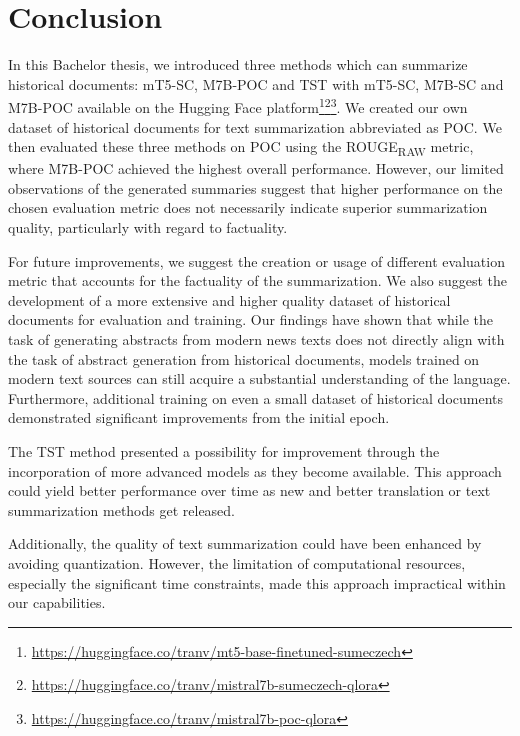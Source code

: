 \documentclass[english, ba, kiv, he, iso690numb, pdf, viewonly]{fasthesis}
\begin{document}
\chapter{Conclusion}
In this Bachelor thesis, we introduced three methods which can summarize historical documents: mT5-SC, M7B-POC and TST with mT5-SC, M7B-SC and M7B-POC available on the Hugging Face platform\footnote{\url{https://huggingface.co/tranv/mt5-base-finetuned-sumeczech}}\footnote{\url{https://huggingface.co/tranv/mistral7b-sumeczech-qlora}}\footnote{\url{https://huggingface.co/tranv/mistral7b-poc-qlora}}. We created our own dataset of historical documents for text summarization abbreviated as POC. We then evaluated these three methods on POC using the ROUGE\textsubscript{RAW} metric, where M7B-POC achieved the highest overall performance. However, our limited observations of the generated summaries suggest that higher performance on the chosen evaluation metric does not necessarily indicate superior summarization quality, particularly with regard to factuality.

For future improvements, we suggest the creation or usage of different evaluation metric that accounts for the factuality of the summarization. We also suggest the development of a more extensive and higher quality dataset of historical documents for evaluation and training. Our findings have shown that while the task of generating abstracts from modern news texts does not directly align with the task of abstract generation from historical documents, models trained on modern text sources can still acquire a substantial understanding of the language. Furthermore, additional training on even a small dataset of historical documents demonstrated significant improvements from the initial epoch.

The TST method presented a possibility for improvement through the incorporation of more advanced models as they become available. This approach could yield better performance over time as new and better translation or text summarization methods get released.

Additionally, the quality of text summarization could have been enhanced by avoiding quantization. However, the limitation of computational resources, especially the significant time constraints, made this approach impractical within our capabilities.

%
%
%
%
\end{document}
